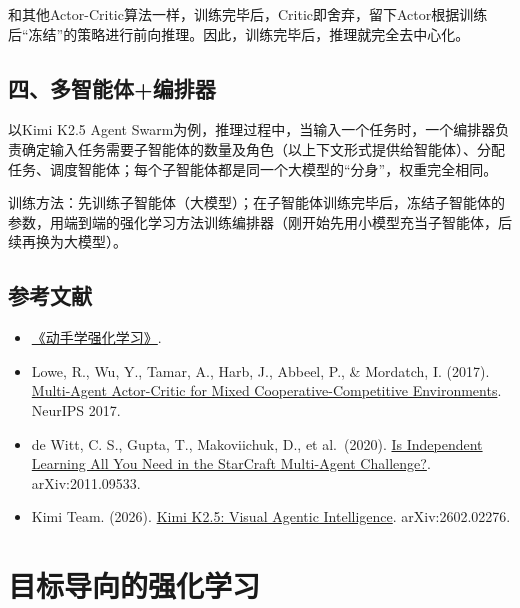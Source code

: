 和其他Actor-Critic算法一样，训练完毕后，Critic即舍弃，留下Actor根据训练后``冻结''的策略进行前向推理。因此，训练完毕后，推理就完全去中心化。

\hypertarget{ux56dbux591aux667aux80fdux4f53ux7f16ux6392ux5668}{%
\subsection{四、多智能体+编排器}\label{ux56dbux591aux667aux80fdux4f53ux7f16ux6392ux5668}}

以Kimi K2.5 Agent Swarm为例，推理过程中，当输入一个任务时，一个编排器负责确定输入任务需要子智能体的数量及角色（以上下文形式提供给智能体）、分配任务、调度智能体；每个子智能体都是同一个大模型的``分身''，权重完全相同。

训练方法：先训练子智能体（大模型）；在子智能体训练完毕后，冻结子智能体的参数，用端到端的强化学习方法训练编排器（刚开始先用小模型充当子智能体，后续再换为大模型）。

\hypertarget{ux53c2ux8003ux6587ux732e-65}{%
\subsection{参考文献}\label{ux53c2ux8003ux6587ux732e-65}}

\vspace{0.25em}
\begin{itemize}
\tightlist
\item
  \href{https://hrl.boyuai.com/}{《动手学强化学习》}.
\item
  Lowe, R., Wu, Y., Tamar, A., Harb, J., Abbeel, P., \& Mordatch, I. (2017). \href{https://arxiv.org/abs/1706.02275}{Multi-Agent Actor-Critic for Mixed Cooperative-Competitive Environments}. NeurIPS 2017.
\item
  de Witt, C. S., Gupta, T., Makoviichuk, D., et al.~(2020). \href{https://arxiv.org/abs/2011.09533}{Is Independent Learning All You Need in the StarCraft Multi-Agent Challenge?}. arXiv:2011.09533.
\item
  Kimi Team. (2026). \href{https://arxiv.org/abs/2602.02276}{Kimi K2.5: Visual Agentic Intelligence}. arXiv:2602.02276.
\end{itemize}

\clearpage

\hypertarget{ux76eeux6807ux5bfcux5411ux7684ux5f3aux5316ux5b66ux4e60}{%
\section{目标导向的强化学习}\label{ux76eeux6807ux5bfcux5411ux7684ux5f3aux5316ux5b66ux4e60}}

